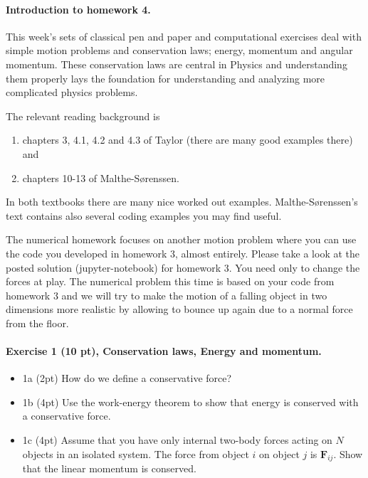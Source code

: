 \documentclass[%
oneside,                 %
final,                   %
10pt]{article}
\begin{document}
\noindent
\paragraph{Introduction to homework 4.}
This week's sets of classical pen and paper and computational
exercises deal with simple motion problems and conservation laws;
energy, momentum and angular momentum. These conservation laws are
central in Physics and understanding them properly lays the foundation
for understanding and analyzing more complicated physics problems.


The relevant reading background is
\begin{enumerate}
\item chapters 3, 4.1, 4.2 and 4.3 of Taylor (there are many good examples there) and

\item chapters 10-13 of Malthe-Sørenssen.
\end{enumerate}

\noindent
In both textbooks there are many nice worked out examples. Malthe-Sørenssen's text contains also several coding examples you may find useful. 

The numerical homework focuses on another motion problem where you can
use the code you developed in homework 3, almost entirely. Please take
a look at the posted solution (jupyter-notebook) for homework 3. You
need only to change the forces at play. The numerical problem this time is based
on your code from homework 3 and we will try to make the motion of a falling object in two dimensions more realistic by allowing to bounce up again due to a normal force from the floor. 



\paragraph{Exercise 1 (10 pt), Conservation laws, Energy and momentum.}
\begin{itemize}
\item 1a (2pt) How do we define a conservative force?

\item 1b (4pt) Use the work-energy theorem to show that energy is conserved with a conservative force.

\item 1c (4pt) Assume that you have only internal two-body forces acting on $N$ objects in an isolated system. The force from object $i$ on object $j$ is $\bm{F}_{ij}$. Show that the linear momentum is conserved.
\end{itemize}
\end{document}
